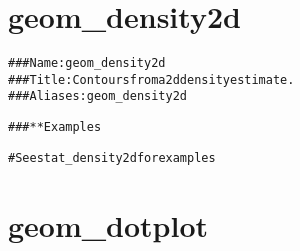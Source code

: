 \documentclass[a4paper,titlepage]{tufte-handout}\usepackage{graphicx, color}
\makeatletter
\newcommand{\hlcomment}[1]{\textcolor[rgb]{0.180392156862745,0.6,0.341176470588235}{#1}}%
\newenvironment{kframe}{%
 \def\at@end@of@kframe{}%
 \ifinner\ifhmode%
  \def\at@end@of@kframe{\end{minipage}}%
  \begin{minipage}{\columnwidth}%
 \fi\fi%
 \def\FrameCommand##1{\hskip\@totalleftmargin \hskip-\fboxsep
 \colorbox{shadecolor}{##1}\hskip-\fboxsep
     \hskip-\linewidth \hskip-\@totalleftmargin \hskip\columnwidth}%
 \MakeFramed {\advance\hsize-\width
   \@totalleftmargin\z@ \linewidth\hsize
   \@setminipage}}%
 {\par\unskip\endMakeFramed%
 \at@end@of@kframe}
\newenvironment{knitrout}{}{} %
\makeatother
\begin{document}
\section{geom\_density2d}

\begin{knitrout}
\color{fgcolor}\begin{kframe}
\begin{alltt}
\hlcomment{### Name: geom_density2d}
\hlcomment{### Title: Contours from a 2d density estimate.}
\hlcomment{### Aliases: geom_density2d}

\hlcomment{### ** Examples}

\hlcomment{# See stat_density2d for examples}



\end{alltt}
\end{kframe}
\end{knitrout}



\section{geom\_dotplot}
\end{document}
